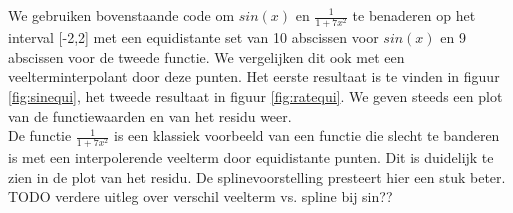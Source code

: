 We gebruiken bovenstaande code om $sin(x)$ en $\frac{1}{1+7x^2}$ te benaderen op het interval [-2,2] met een equidistante set van 10 abscissen voor $sin(x)$ en 9 abscissen voor de tweede functie. We vergelijken dit ook met een veelterminterpolant door deze punten. Het eerste resultaat is te vinden in figuur \ref{fig:sinequi}, het tweede resultaat in figuur \ref{fig:ratequi}. We geven steeds een plot van de functiewaarden en van het residu weer.
\\
De functie $\frac{1}{1+7x^2}$ is een klassiek voorbeeld van een functie die slecht te banderen is met een interpolerende veelterm door equidistante punten. Dit is duidelijk te zien in de plot van het residu. De splinevoorstelling presteert hier een stuk beter. 
\\
TODO verdere uitleg over verschil veelterm vs. spline bij sin??

